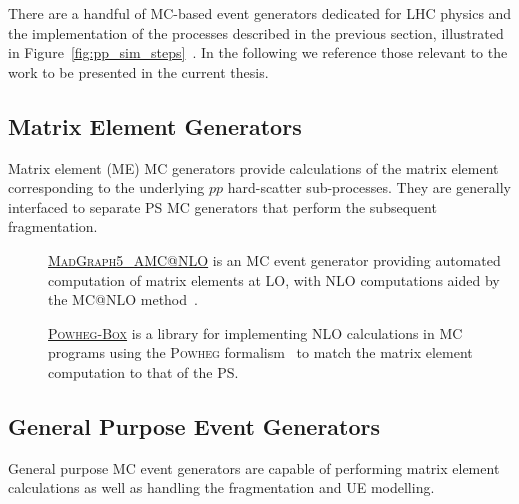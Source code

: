 There are a handful of MC-based event generators dedicated for LHC physics
and the implementation of the processes described in the previous section, illustrated
in Figure~\ref{fig:pp_sim_steps}~\cite{Buckley:2011ms}.
In the following we reference those relevant to the work to be presented in the current
thesis.

\subsection{Matrix Element Generators}
\label{sec:mc_gen_me}

Matrix element (ME) MC generators provide calculations of the matrix element corresponding
to the underlying $pp$ hard-scatter sub-processes.
They are generally interfaced to separate PS MC generators that perform the subsequent fragmentation.

\begin{description}
    \item[] \underline{\textsc{MadGraph5\_AMC@NLO}} \cite{MGFive} is an MC event generator providing automated
        computation of matrix elements at LO, with NLO computations aided by the MC@NLO method~\cite{AMCNLO}.
    \item[] \underline{\textsc{Powheg-Box}} \cite{POWHEGBOX} is a library for implementing NLO calculations in
        MC programs using the \textsc{Powheg} formalism~\cite{POWHEGMETHOD} to match the matrix element
        computation to that of the PS.
\end{description}

\subsection{General Purpose Event Generators}
\label{sec:mc_gen_gen_purpose}

General purpose MC event generators are capable of performing matrix element calculations
as well as handling the fragmentation and UE modelling.

